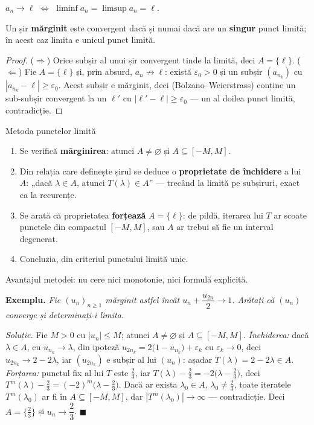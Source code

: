 \begin{propozitie}
$a_n\to\ell$ $\iff$ $\liminf a_n=\limsup a_n=\ell$.
\end{propozitie}

\begin{teorema}
Un șir \textbf{mărginit} este convergent dacă și numai dacă are un \textbf{singur} punct limită; în acest caz limita e unicul punct limită.
\end{teorema}
\begin{proof}
($\Rightarrow$) Orice subșir al unui șir convergent tinde la limită, deci $A=\{\ell\}$.
($\Leftarrow$) Fie $A=\{\ell\}$ și, prin absurd, $a_n\not\to\ell$: există $\varepsilon_0>0$ și un subșir $(a_{n_k})$ cu $|a_{n_k}-\ell|\ge\varepsilon_0$. Acest subșir e mărginit, deci (Bolzano--Weierstrass) conține un sub-subșir convergent la un $\ell'$ cu $|\ell'-\ell|\ge\varepsilon_0$ --- un al doilea punct limită, contradicție.
\end{proof}

\begin{tehbox}{Metoda punctelor limită}
\begin{enumerate}[leftmargin=*, itemsep=1pt]
\item Se verifică \textbf{mărginirea}: atunci $A\neq\varnothing$ și $A\subseteq[-M,M]$.
\item Din relația care definește șirul se deduce o \textbf{proprietate de închidere} a lui $A$: „dacă $\lambda\in A$, atunci $T(\lambda)\in A$'' --- trecând la limită pe subșiruri, exact ca la recurențe.
\item Se arată că proprietatea \textbf{forțează} $A=\{\ell\}$: de pildă, iterarea lui $T$ ar scoate punctele din compactul $[-M,M]$, sau $A$ ar trebui să fie un interval degenerat.
\item Concluzia, din criteriul punctului limită unic.
\end{enumerate}
Avantajul metodei: nu cere nici monotonie, nici formulă explicită.
\end{tehbox}

\textbf{Exemplu.} \emph{Fie $(u_n)_{n\ge1}$ mărginit astfel încât $u_n+\dfrac{u_{2n}}{2}\to1$. Arătați că $(u_n)$ converge și determinați-i limita.}

\emph{Soluție.} Fie $M>0$ cu $|u_n|\le M$; atunci $A\neq\varnothing$ și $A\subseteq[-M,M]$.
\emph{Închiderea:} dacă $\lambda\in A$, cu $u_{n_k}\to\lambda$, din ipoteză $u_{2n_k}=2\big(1-u_{n_k}\big)+\varepsilon_k$ cu $\varepsilon_k\to0$, deci $u_{2n_k}\to2-2\lambda$, iar $(u_{2n_k})$ e subșir al lui $(u_n)$: așadar $T(\lambda)=2-2\lambda\in A$.
\emph{Forțarea:} punctul fix al lui $T$ este $\frac23$, iar $T(\lambda)-\frac23=-2\big(\lambda-\frac23\big)$, deci $T^m(\lambda)-\frac23=(-2)^m\big(\lambda-\frac23\big)$. Dacă ar exista $\lambda_0\in A$, $\lambda_0\neq\frac23$, toate iteratele $T^m(\lambda_0)$ ar fi în $A\subseteq[-M,M]$, dar $|T^m(\lambda_0)|\to\infty$ --- contradicție. Deci $A=\{\frac23\}$ și $u_n\to\dfrac23$. $\blacksquare$

